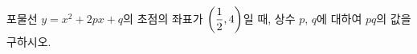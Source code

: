 포물선 $y=x^2+2px+q$의 초점의 좌표가 $\left(\dfrac{1}{2}{,}\mkern3mu\mathopen{}4\right)$일 때, 상수 $p$, $q$에 대하여 $pq$의 값을 구하시오.
